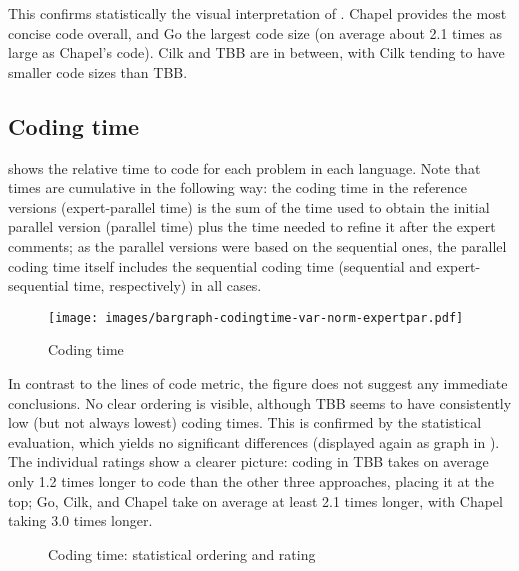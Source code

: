 This confirms statistically the visual interpretation of . Chapel provides the most concise code overall, and Go the largest code size (on average about 2.1 times as large as Chapel's code). Cilk and TBB are in between, with Cilk tending to have smaller code sizes than TBB.

\subsection{Coding time}
\label{sec:coding-time}

 shows the relative time to code for each problem in each language. Note that times are cumulative in the following way: the coding time in the reference versions (expert-parallel time) is the sum of the time used to obtain the initial parallel version (parallel time) plus the time needed to refine it after the expert comments; as the parallel versions were based on the sequential ones, the parallel coding time itself includes the sequential coding time (sequential and expert-sequential time, respectively) in all cases. 

\begin{figure}[htbp]
  \centering
  \texttt{[image: images/bargraph-codingtime-var-norm-expertpar.pdf]}
  \caption{Coding time}
  \label{fig:time}
\end{figure}

In contrast to the lines of code metric, the figure does not suggest any immediate conclusions. No clear ordering is visible, although TBB seems to have consistently low (but not always lowest) coding times. This is confirmed by the statistical evaluation, which yields no significant differences (displayed again as graph in ). The individual ratings show a clearer picture: coding in TBB takes on average only 1.2 times longer to code than the other three approaches, placing it at the top; Go, Cilk, and Chapel take on average at least 2.1 times longer, with Chapel taking 3.0 times longer. 

\begin{figure}[htbp]
  \centering
  \vspace{-2ex}
  \caption{Coding time: statistical ordering and rating}
  \label{fig:ord:codingtime}
\end{figure}

